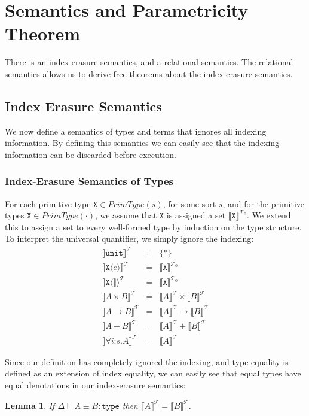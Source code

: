 \documentclass[natbib,preprint]{sigplanconf}
\newcommand{\sortType}{\texttt{type}}
\newcommand{\tyUnit}{\texttt{unit}}
\newcommand{\tyPrim}[2]{\texttt{#1}\langle #2 \rangle}
\newcommand{\tyPrimNm}[1]{\texttt{#1}}
\newcommand{\tyArr}{\to}
\newcommand{\tyProduct}{\times}
\newcommand{\tySem}[1]{\llbracket #1 \rrbracket^{\mathcal{T}}}
\newcommand{\tyPrimSem}[1]{\llbracket \tyPrimNm{#1} \rrbracket^{\mathcal{T}_0}}
\newtheorem{lemma}{Lemma}
\begin{document}
\section{Semantics and Parametricity Theorem}

There is an index-erasure semantics, and a relational semantics. The
relational semantics allows us to derive free theorems about the
index-erasure semantics.

\subsection{Index Erasure Semantics}

We now define a semantics of types and terms that ignores all indexing
information. By defining this semantics we can easily see that the
indexing information can be discarded before execution.

\subsubsection{Index-Erasure Semantics of Types}

For each primitive type $\tyPrimNm{X} \in \mathit{PrimType}(s)$, for
some sort $s$, and for the primitive types $\tyPrimNm{X} \in
\mathit{PrimType}(\cdot)$, we assume that $\tyPrimNm{X}$ is assigned a
set $\tyPrimSem{X}$. We extend this to assign a set to every
well-formed type by induction on the type structure. To interpret the
universal quantifier, we simply ignore the indexing:
\begin{eqnarray*}
  \tySem{\tyUnit} & = & \{*\} \\
  \tySem{\tyPrim{X}{e}} & = & \tyPrimSem{X} \\
  \tySem{\tyPrim{X}} & = & \tyPrimSem{X} \\
  \tySem{A \tyProduct B} & = & \tySem{A} \times \tySem{B} \\
  \tySem{A \tyArr B} & = & \tySem{A} \to \tySem{B} \\
  \tySem{A + B} & = & \tySem{A} + \tySem{B} \\
  \tySem{\forall i\mathord:s. A} & = & \tySem{A}
\end{eqnarray*}

Since our definition has completely ignored the indexing, and type
equality is defined as an extension of index equality, we can easily
see that equal types have equal denotations in our index-erasure
semantics:
\begin{lemma}\label{lem:tyeq-erasure}
  If $\Delta \vdash A \equiv B : \sortType$ then $\tySem{A} =
  \tySem{B}$.
\end{lemma}
\end{document}
